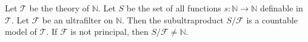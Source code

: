 Let $\mathcal{T}$ be the theory of $\mathbb{N}$. Let $S$ be the set of all functions $s: \mathbb{N} \to \mathbb{N}$ definable in $\mathcal{T}$. Let $\mathcal{F}$ be an ultrafilter on $\mathbb{N}$. Then the subultraproduct $S/\mathcal{F}$ is a countable model of $\mathcal{T}$. If $\mathcal{F}$ is not principal, then $S/\mathcal{F} \neq \mathbb{N}$.
